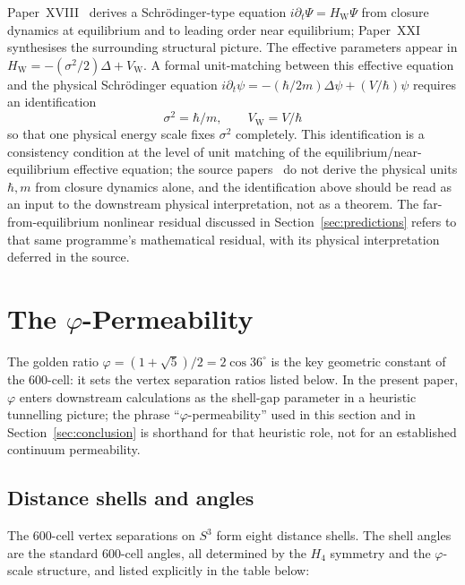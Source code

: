 \documentclass[12pt]{article}
\newcommand{\VW}{V_{\mathrm{W}}}
\newcommand{\HW}{H_{\mathrm{W}}}
\begin{document}
Paper~XVIII~\citep{SmartXVIII} derives a Schr\"odinger-type equation $i\partial_t\Psi = \HW\Psi$ from closure dynamics at equilibrium and to leading order near equilibrium; Paper~XXI~\citep{SmartXXI} synthesises the surrounding structural picture. The effective parameters appear in $\HW = -(\sigma^2/2)\Delta + \VW$. A formal unit-matching between this effective equation and the physical Schr\"odinger equation $i\partial_t\psi = -(\hbar/2m)\Delta\psi + (V/\hbar)\psi$ requires an identification
\begin{equation}\label{eq:units}
    \sigma^2 = \hbar/m, \qquad \VW = V/\hbar
\end{equation}
so that one physical energy scale fixes $\sigma^2$ completely. This identification is a consistency condition at the level of unit matching of the equilibrium/near-equilibrium effective equation; the source papers~\citep{SmartXVIII, SmartXXI} do not derive the physical units $\hbar, m$ from closure dynamics alone, and the identification above should be read as an input to the downstream physical interpretation, not as a theorem. The far-from-equilibrium nonlinear residual discussed in Section~\ref{sec:predictions} refers to that same programme's mathematical residual, with its physical interpretation deferred in the source.

\section{The $\varphi$-Permeability}\label{sec:phi}

The golden ratio $\varphi = (1+\sqrt{5})/2 = 2\cos 36^\circ$ is the key geometric constant of the 600-cell: it sets the vertex separation ratios listed below. In the present paper, $\varphi$ enters downstream calculations as the shell-gap parameter in a heuristic tunnelling picture; the phrase ``$\varphi$-permeability'' used in this section and in Section~\ref{sec:conclusion} is shorthand for that heuristic role, not for an established continuum permeability.

\subsection{Distance shells and angles}

The 600-cell vertex separations on $S^3$ form eight distance shells. The shell angles are the standard 600-cell angles, all determined by the $H_4$ symmetry and the $\varphi$-scale structure, and listed explicitly in the table below:
\end{document}
